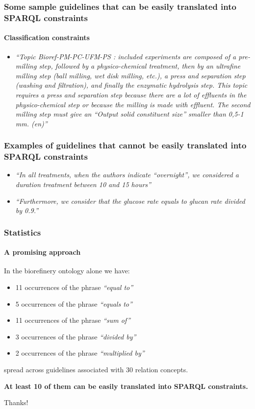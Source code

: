 \documentclass{beamer}
\begin{document}
\begin{frame}
  \frametitle{Some sample guidelines that can be easily translated into SPARQL
  constraints}
  \framesubtitle{Classification constraints}

  \begin{itemize}
    \item \textit{``Topic Bioref-PM-PC-UFM-PS : included experiments are
      composed of a pre-milling step, followed by a physico-chemical treatment,
    then by an ultrafine milling step (ball milling, wet disk milling, etc.), a
  press and separation step (washing and filtration), and finally the enzymatic
hydrolysis step. This topic requires a press and separation step because there
are a lot of effluents in the physico-chemical step or because the milling is
made with effluent. The second milling step must give an “Output solid
constituent size” smaller than 0,5-1 mm. (en)''}
  \end{itemize}
\end{frame}

\begin{frame}
  \frametitle{Examples of guidelines that \textbf{cannot} be easily
  translated into SPARQL constraints}

  \begin{itemize}
    \item \textit{``In all treatments, when the authors indicate ``overnight'',
      we considered a duration treatment between 10 and 15 hours''}

    \pause

    \item \textit{``Furthermore, we consider that the glucose rate equals to
      glucan rate divided by 0.9.''}
  \end{itemize}
\end{frame}

\begin{frame}
  \frametitle{Statistics}
  \framesubtitle{A promising approach}

  In the biorefinery ontology alone we have:

  \begin{itemize}
    \item 11 occurrences of the phrase \textit{``equal to''}
    \item 5 occurrences of the phrase \textit{``equals to''}
    \item 11 occurrences of the phrase \textit{``sum of''}
    \item 3 occurrences of the phrase \textit{``divided by''}
    \item 2 occurrences of the phrase \textit{``multiplied by''}
  \end{itemize}

  spread across guidelines associated with 30 relation concepts.

  \vspace{1em}

  \textbf{At least 10 of them can be easily translated into SPARQL constraints.}
\end{frame}

\begin{frame}
  \begin{center}
    \Huge{Thanks!}
  \end{center}
\end{frame}
\end{document}
